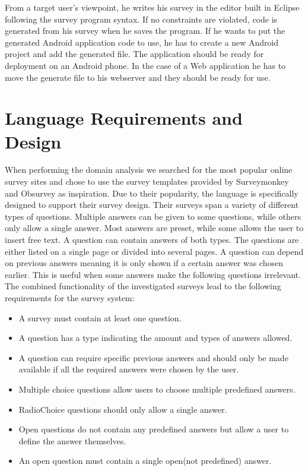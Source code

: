 \documentclass[runningheads]{llncs}
\begin{document}
From a target user's viewpoint, he writes his survey in the editor built in Eclipse following the survey program syntax. If no constraints are violated, code is generated from his survey when he saves the program. If he wants to put the generated Android application code to use, he has to create a new Android project and add the generated file. The application should be ready for deployment on an Android phone. In the case of a Web application he has to move the generate file to his webserver and they should be ready for use.

\section{Language Requirements and Design}
When performing the domain analysis we searched for the most popular online survey sites and chose to use the survey templates provided by Surveymonkey \cite{surveymonkey} and Obsurvey \cite{obsurvey} as inspiration. Due to their popularity, the language is specifically designed to support their survey design. Their surveys span a variety of different types of questions. Multiple answers can be given to some questions, while others only allow a single answer. Most answers are preset, while some allows the user to insert free text. A question can contain answers of both types. The questions are either listed on a single page or divided into several pages. A question can depend on previous answers meaning it is only shown if a certain answer was chosen earlier. This is useful when some answers make the following questions irrelevant. The combined functionality of the investigated surveys lead to the following requirements for the survey system:
\begin{itemize}
\item  A survey must contain at least one question. 
\item A question has a type indicating the amount and types of answers allowed. 
\item A question can require specific previous answers and should only be made available if all the required answers were chosen by the user. 
\item Multiple choice questions allow users to choose multiple predefined answers.
\item RadioChoice questions should only allow a single answer. 
\item Open questions do not contain any predefined answers but allow a user to define the answer themselves. 
\item An open question must contain a single open(not predefined) answer.
\end{itemize}
\end{document}
